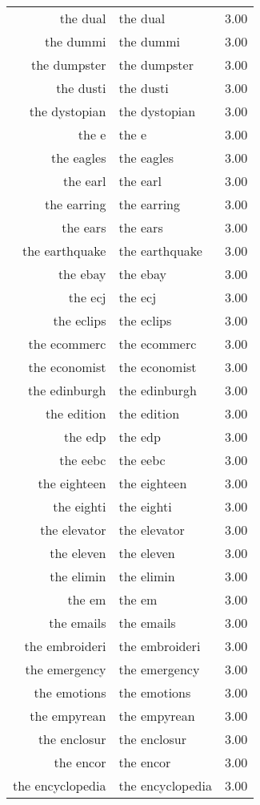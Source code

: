 \begin{table}[ht]
\begin{tabular}{rlr}
  the dual & the dual & 3.00 \\ 
  the dummi & the dummi & 3.00 \\ 
  the dumpster & the dumpster & 3.00 \\ 
  the dusti & the dusti & 3.00 \\ 
  the dystopian & the dystopian & 3.00 \\ 
  the e & the e & 3.00 \\ 
  the eagles & the eagles & 3.00 \\ 
  the earl & the earl & 3.00 \\ 
  the earring & the earring & 3.00 \\ 
  the ears & the ears & 3.00 \\ 
  the earthquake & the earthquake & 3.00 \\ 
  the ebay & the ebay & 3.00 \\ 
  the ecj & the ecj & 3.00 \\ 
  the eclips & the eclips & 3.00 \\ 
  the ecommerc & the ecommerc & 3.00 \\ 
  the economist & the economist & 3.00 \\ 
  the edinburgh & the edinburgh & 3.00 \\ 
  the edition & the edition & 3.00 \\ 
  the edp & the edp & 3.00 \\ 
  the eebc & the eebc & 3.00 \\ 
  the eighteen & the eighteen & 3.00 \\ 
  the eighti & the eighti & 3.00 \\ 
  the elevator & the elevator & 3.00 \\ 
  the eleven & the eleven & 3.00 \\ 
  the elimin & the elimin & 3.00 \\ 
  the em & the em & 3.00 \\ 
  the emails & the emails & 3.00 \\ 
  the embroideri & the embroideri & 3.00 \\ 
  the emergency & the emergency & 3.00 \\ 
  the emotions & the emotions & 3.00 \\ 
  the empyrean & the empyrean & 3.00 \\ 
  the enclosur & the enclosur & 3.00 \\ 
  the encor & the encor & 3.00 \\ 
  the encyclopedia & the encyclopedia & 3.00 \\ 

\end{tabular}
\end{table}
